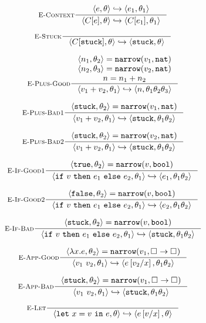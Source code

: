 \begin{figure}
$$
\inference[\recontext]
  {\step{e}{\su}{e_1}{\su_1}}
  {\step{C[e]}{\su}{C[e_1]}{\su_1}}
$$

$$
\inference[\restuck]
  {}
  {\step{C[\stuck]}{\su}{\stuck}{\su}}
$$

$$
\inference[\replusgood]
  {\pair{n_1}{\su_2} = \force{v_1}{\tnat} \\
   \pair{n_2}{\su_3} = \force{v_2}{\tnat} \\ 
   n = \eplus{n_1}{n_2}}
  {\step{\eplus{v_1}{v_2}}{\su_1}{n}{\su_1\su_2\su_3}}
$$

$$
\inference[\replusbadone]
  {\pair{\stuck}{\su_2} = \force{v_1}{\tnat}}
  {\step{\eplus{v_1}{v_2}}{\su_1}{\stuck}{\su_1\su_2}}
$$

$$
\inference[\replusbadtwo]
  {\pair{\stuck}{\su_2} = \force{v_2}{\tnat}}
  {\step{\eplus{v_1}{v_2}}{\su_1}{\stuck}{\su_1\su_2}}
$$

$$
\inference[\reifgoodone]
  {\pair{\etrue}{\su_2} = \force{v}{\tbool}}
  {\step{\eif{v}{e_1}{e_2}}{\su_1}{e_1}{\su_1\su_2}}
$$

$$
\inference[\reifgoodtwo]
  {\pair{\efalse}{\su_2} = \force{v}{\tbool}}
  {\step{\eif{v}{e_1}{e_2}}{\su_1}{e_2}{\su_1\su_2}}
$$

$$
\inference[\reifbad]
  {\pair{\stuck}{\su_2} = \force{v}{\tbool}}
  {\step{\eif{v}{e_1}{e_2}}{\su_1}{\stuck}{\su_1\su_2}}
$$

$$
\inference[\reappgood]
  {\pair{\efun{x}{e}}{\su_2} = \force{v_1}{\tfun{\hole{}}{\hole{}}}}
  {\step{\eapp{v_1}{v_2}}{\su_1}{e\sub{x}{v_2}}{\su_1\su_2}}
$$

$$
\inference[\reappbad]
  {\pair{\stuck}{\su_2} = \force{v_1}{\tfun{\hole{}}{\hole{}}}}
  {\step{\eapp{v_1}{v_2}}{\su_1}{\stuck}{\su_1\su_2}}
$$

$$
\inference[\relet]
  {}
  {\step{\elet{x}{v}{e}}{\su}{e\sub{x}{v}}{\su}}
$$
\\ [0.1in]



\end{figure}
